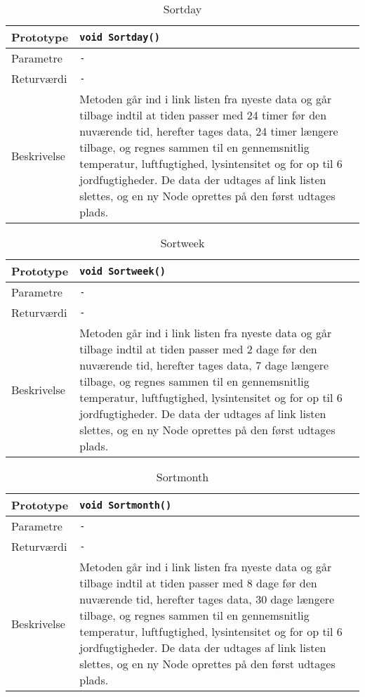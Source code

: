 \begin{table}[h]
\begin{tabularx}{\textwidth}{| L{2.5 cm} | Z |} \hline
Prototype & \texttt{void Sortday()} \\\hline
Parametre & \texttt{-}\\\hline
Returværdi & \texttt{-} \\\hline
Beskrivelse & Metoden går ind i link listen fra nyeste data og går tilbage indtil at tiden passer med 24 timer før den nuværende tid, herefter tages data, 24 timer længere tilbage, og regnes sammen til en gennemsnitlig temperatur, luftfugtighed, lysintensitet og for op til 6 jordfugtigheder. De data der udtages af link listen slettes, og en ny Node oprettes på den først udtages plads. \\\hline
\end{tabularx}
\caption{Sortday}
\label{table:Datalog_Sortday}
\end{table}

\clearpage

\begin{table}[h]
\begin{tabularx}{\textwidth}{| L{2.5 cm} | Z |} \hline
Prototype & \texttt{void Sortweek()} \\\hline
Parametre & \texttt{-}\\\hline
Returværdi & \texttt{-} \\\hline
Beskrivelse & Metoden går ind i link listen fra nyeste data og går tilbage indtil at tiden passer med 2 dage før den nuværende tid, herefter tages data, 7 dage længere tilbage, og regnes sammen til en gennemsnitlig temperatur, luftfugtighed, lysintensitet og for op til 6 jordfugtigheder. De data der udtages af link listen slettes, og en ny Node oprettes på den først udtages plads. \\\hline
\end{tabularx}
\caption{Sortweek}
\label{table:Datalog_Sortweek}
\end{table}


\begin{table}[ht]
\begin{tabularx}{\textwidth}{| L{2.5 cm} | Z |} \hline
Prototype & \texttt{void Sortmonth()} \\\hline
Parametre & \texttt{-}\\\hline
Returværdi & \texttt{-} \\\hline
Beskrivelse & Metoden går ind i link listen fra nyeste data og går tilbage indtil at tiden passer med 8 dage før den nuværende tid, herefter tages data, 30 dage længere tilbage, og regnes sammen til en gennemsnitlig temperatur, luftfugtighed, lysintensitet og for op til 6 jordfugtigheder. De data der udtages af link listen slettes, og en ny Node oprettes på den først udtages plads. \\\hline
\end{tabularx}
\caption{Sortmonth}
\label{table:Datalog_Sortmonth}
\end{table}

\clearpage